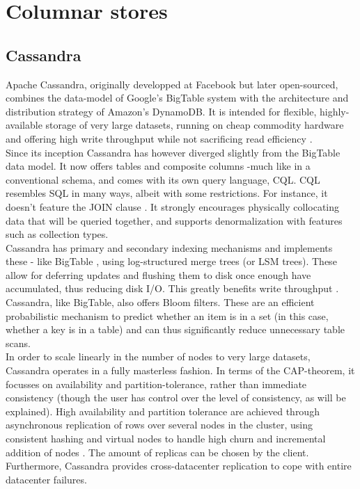 \documentclass{IEEEtran}
\begin{document}
\section{Columnar stores}
\subsection{Cassandra}

Apache Cassandra, originally developped at Facebook but later open-sourced, combines the data-model of Google's BigTable system with the architecture and distribution strategy of Amazon's DynamoDB. It is intended for flexible, highly-available storage of very large datasets, running on cheap commodity hardware and offering high write throughput while not sacrificing read efficiency \cite{lakshman2010cassandra}.
\\
Since its inception Cassandra has however diverged slightly from the BigTable data model. It now offers tables and composite columns -much like in a conventional schema, and comes with its own query language, CQL\cite{cassandra_then&now}. CQL resembles SQL in many ways, albeit with some restrictions. For instance, it doesn't feature the JOIN clause \cite{cassandra_cql}. It strongly encourages physically collocating data that will be queried together, and supports denormalization with features such as collection types.\\
Cassandra has primary and secondary indexing mechanisms and implements these - like BigTable \cite{chang2008bigtable}, using log-structured merge trees (or LSM trees). These allow for deferring updates and flushing them to disk once enough have accumulated, thus reducing disk I/O. This greatly benefits write throughput \cite{o1996log}\cite{sears2012blsm}\cite{lakshman2010cassandra}. Cassandra, like BigTable, also offers Bloom filters\cite{mullin1983second}. These are an efficient probabilistic mechanism to predict whether an item is in a set (in this case, whether a key is in a table) and can thus significantly reduce unnecessary table scans\cite{lakshman2010cassandra}.\\
In order to scale linearly in the number of nodes to very large datasets, Cassandra operates in a fully masterless fashion. In terms of the CAP-theorem, it focusses on availability and partition-tolerance, rather than immediate consistency (though the user has control over the level of consistency, as will be explained)\cite{brewer2000towards}. High availability and partition tolerance are achieved through asynchronous replication of rows over several nodes in the cluster, using consistent hashing and virtual nodes to handle high churn and incremental addition of nodes \cite{decandia2007dynamo} \cite{lakshman2010cassandra} \cite{cassandra_then&now}. The amount of replicas can be chosen by the client. Furthermore, Cassandra provides cross-datacenter replication to cope with entire datacenter failures.
\end{document}
